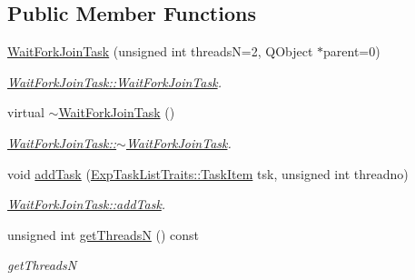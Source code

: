 \subsection*{Public Member Functions}
\begin{DoxyCompactItemize}
\item 
\hyperlink{class_wait_fork_join_task_af7cf35f4dae1596cf11da45773c5505d}{Wait\+Fork\+Join\+Task} (unsigned int threads\+N=2, Q\+Object $\ast$parent=0)
\begin{DoxyCompactList}\small\item\em \hyperlink{class_wait_fork_join_task_af7cf35f4dae1596cf11da45773c5505d}{Wait\+Fork\+Join\+Task\+::\+Wait\+Fork\+Join\+Task}. \end{DoxyCompactList}\item 
\hypertarget{class_wait_fork_join_task_acedd04001f8f8abc11b9b503f6f60b3f}{}virtual \hyperlink{class_wait_fork_join_task_acedd04001f8f8abc11b9b503f6f60b3f}{$\sim$\+Wait\+Fork\+Join\+Task} ()\label{class_wait_fork_join_task_acedd04001f8f8abc11b9b503f6f60b3f}

\begin{DoxyCompactList}\small\item\em \hyperlink{class_wait_fork_join_task_acedd04001f8f8abc11b9b503f6f60b3f}{Wait\+Fork\+Join\+Task\+::$\sim$\+Wait\+Fork\+Join\+Task}. \end{DoxyCompactList}\item 
void \hyperlink{class_wait_fork_join_task_ad7a5785f883690aee04d45cbc7788681}{add\+Task} (\hyperlink{struct_exp_task_list_traits_1_1_task_item}{Exp\+Task\+List\+Traits\+::\+Task\+Item} tsk, unsigned int threadno)
\begin{DoxyCompactList}\small\item\em \hyperlink{class_wait_fork_join_task_ad7a5785f883690aee04d45cbc7788681}{Wait\+Fork\+Join\+Task\+::add\+Task}. \end{DoxyCompactList}\item 
\hypertarget{class_wait_fork_join_task_a97f799474685f172b70ee51445b2e654}{}unsigned int \hyperlink{class_wait_fork_join_task_a97f799474685f172b70ee51445b2e654}{get\+Threads\+N} () const \label{class_wait_fork_join_task_a97f799474685f172b70ee51445b2e654}

\begin{DoxyCompactList}\small\item\em get\+Threads\+N \end{DoxyCompactList}\end{DoxyCompactItemize}

